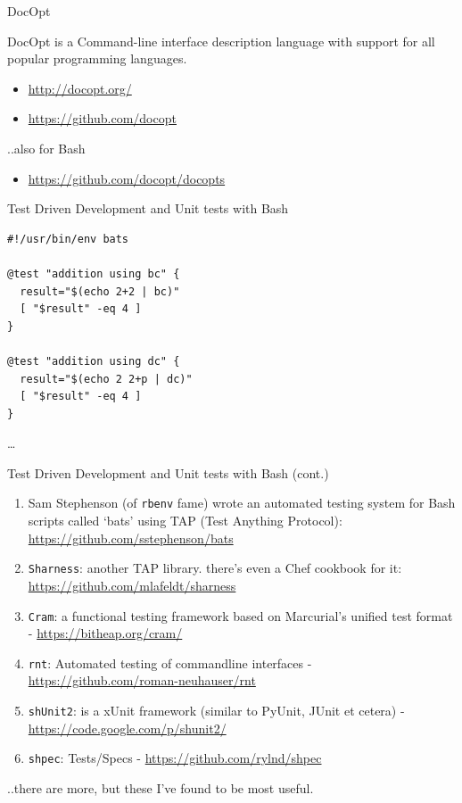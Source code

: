 \begin{frame}{DocOpt}

DocOpt is a Command-line interface description language with support for
all popular programming languages.

\begin{itemize}
\itemsep1pt\parskip0pt
\item
  \url{http://docopt.org/}
\item
  \url{https://github.com/docopt}
\end{itemize}

\vfill
..also for Bash

\begin{itemize}
\itemsep1pt\parskip0pt
\item
  \url{https://github.com/docopt/docopts}
\end{itemize}

\end{frame}

\begin{frame}[fragile]{Test Driven Development and Unit tests with Bash}

\begin{verbatim}
#!/usr/bin/env bats

@test "addition using bc" {
  result="$(echo 2+2 | bc)"
  [ "$result" -eq 4 ]
}

@test "addition using dc" {
  result="$(echo 2 2+p | dc)"
  [ "$result" -eq 4 ]
}
\end{verbatim}

\ldots{}

\end{frame}

\begin{frame}{Test Driven Development and Unit tests with Bash (cont.)}

\begin{enumerate}
\def\labelenumi{\arabic{enumi}.}
\itemsep1pt\parskip0pt
\item
  Sam Stephenson (of \texttt{rbenv} fame) wrote an automated testing
  system for Bash scripts called `bats' using TAP (Test Anything
  Protocol): \url{https://github.com/sstephenson/bats}
\item
  \texttt{Sharness}: another TAP library. there's even a Chef cookbook
  for it: \url{https://github.com/mlafeldt/sharness}
\item
  \texttt{Cram}: a functional testing framework based on Marcurial's
  unified test format - \url{https://bitheap.org/cram/}
\item
  \texttt{rnt}: Automated testing of commandline interfaces -
  \url{https://github.com/roman-neuhauser/rnt}
\item
  \texttt{shUnit2}: is a xUnit framework (similar to PyUnit, JUnit et
  cetera) - \url{https://code.google.com/p/shunit2/}
\item
  \texttt{shpec}: Tests/Specs - \url{https://github.com/rylnd/shpec}
\end{enumerate}

..there are more, but these I've found to be most useful.

\end{frame}

